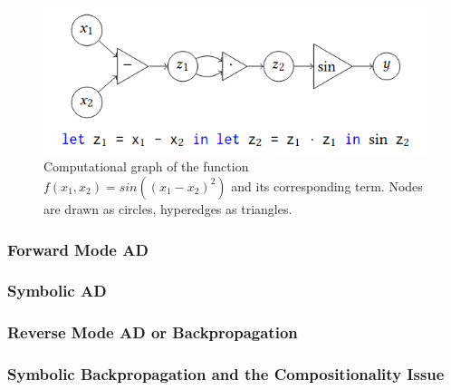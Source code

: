 \begin{figure}[h!]
	\centering
	\includegraphics[scale=0.5]{img/compGraph2}
	\caption{Computational graph of the function $f(x_1,x_2)=sin((x_1-x_2)^2)$ and its corresponding term. Nodes are drawn as circles, 			hyperedges as triangles.}
	\label{compGraph2}
\end{figure}

\subsubsection{Forward Mode AD}

\subsubsection{Symbolic AD}

\subsubsection{Reverse Mode AD or Backpropagation}

\subsubsection{Symbolic Backpropagation and the Compositionality Issue}